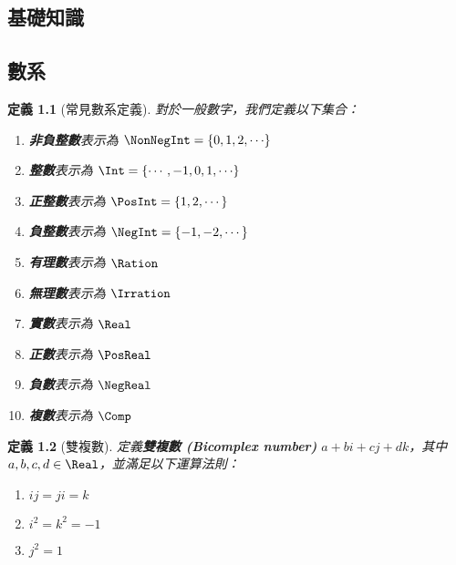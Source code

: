 \documentclass[12pt,a4paper,oneside]{report}
\begin{document}
\begin{CJK}{UTF8}{bkai}
\newtheorem{mydef}{定義}[chapter]
\newtheorem*{mydef*}{定義}
\newtheorem{myrule}[mydef]{原理}
\newtheorem{mythm}[mydef]{定理}
\newtheorem{mylma}[mydef]{引理}
\newtheorem{mypropo}[mydef]{性質}
\newtheorem{mycorol}[mydef]{推論}
\newtheorem{myexample}[mydef]{範例}
\newtheorem*{mynote*}{註}
\renewenvironment{proof}{\textbf{證明}}{\qed}
\newenvironment{mysol}{\textbf{解答}}{\qed}


\fi

\chapter{基礎知識}

\section{數系}

\begin{mydef}[常見數系定義]
\label{def:intro:number_set_notation}
對於一般數字，我們定義以下集合：
\begin{enumerate}
\item \textbf{非負整數}表示為 $\NonNegInt={\{{0,1,2,\cdots}\}}$
\item \textbf{整數}表示為 $\Int={\{{\cdots,-1,0,1,\cdots}\}}$
\item \textbf{正整數}表示為 $\PosInt={\{1,2,\cdots\}}$
\item \textbf{負整數}表示為 $\NegInt={\{-1,-2,\cdots\}}$
\item \textbf{有理數}表示為 $\Ration$
\item \textbf{無理數}表示為 $\Irration$
\item \textbf{實數}表示為 $\Real$
\item \textbf{正數}表示為 $\PosReal$
\item \textbf{負數}表示為 $\NegReal$
\item \textbf{複數}表示為 $\Comp$
\end{enumerate}
\end{mydef}

\begin{mydef}[雙複數]
定義\textbf{雙複數 (Bicomplex number)} $a+bi+cj+dk$，其中 $a,b,c,d\in{\Real}$，並滿足以下運算法則：
\begin{enumerate}
\item $ij=ji=k$
\item $i^2=k^2=-1$
\item $j^2=1$
\end{enumerate}
\end{mydef}


\end{CJK}
\end{document}
